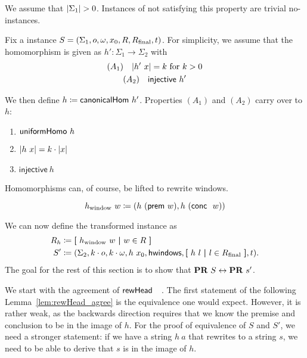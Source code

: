 We assume that $|\Sigma_1| > 0$. Instances of \PR{} not satisfying this property are trivial no-instances. 

Fix a \PR{} instance $S = (\Sigma_1, o, \omega, x_0, R, R_{\text{final}}, t)$. 
For simplicity, we assume that the homomorphism is given as $h' : \Sigma_1 \rightarrow \Sigma_2$ with 
\begin{gather*}
  (A_1) \quad |h'~x| = k~\text{for } k > 0 \\
  (A_2) \quad \textsf{injective}~h'
\end{gather*}

We then define $h \coloneqq \textsf{canonicalHom}~h'$. 
Properties $(A_1)$ and $(A_2)$ carry over to $h$:
\begin{proposition}
  \begin{enumerate}
    \item $\textsf{uniformHomo}~h$
    \item $|h~x| = k \cdot |x|$
    \item $\textsf{injective}~h$
  \end{enumerate}
\end{proposition}

Homomorphisms can, of course, be lifted to rewrite windows. 
\begin{definition}
  \[h_\text{window}~w\coloneqq (h~(\textsf{prem}~w), h~(\textsf{conc}~~w)) \]
\end{definition}
We can now define the transformed \PR{} instance as
\begin{align*}
  R_h &\coloneqq \textbf{[}~ h_\text{window}~w ~\textbf{|}~ w \in R ~\textbf{]} \\
  S' &\coloneqq (\Sigma_2, k \cdot o, k \cdot \omega, h~x_0, \textsf{hwindows}, \textbf{[}~ h~l ~\textbf{|}~ l \in R_{\text{final}} ~\textbf{]}, t).
\end{align*}
The goal for the rest of this section is to show that $\textbf{PR}{}~S \leftrightarrow \textbf{PR}{}~s'$. 

We start with the agreement of $\textsf{rewHead}~~~$.
The first statement of the following Lemma~\ref{lem:rewHead_agree} is the equivalence one would expect. However, it is rather weak, as the backwards direction requires that we know the premise and conclusion to be in the image of $h$.
For the proof of equivalence of $S$ and $S'$, we need a stronger statement: if we have a string $h~a$ that rewrites to a string $s$, we need to be able to derive that $s$ is in the image of $h$.

